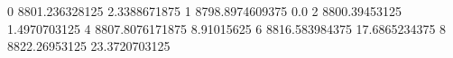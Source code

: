 0 8801.236328125 2.3388671875
1 8798.8974609375 0.0
2 8800.39453125 1.4970703125
4 8807.8076171875 8.91015625
6 8816.583984375 17.6865234375
8 8822.26953125 23.3720703125
